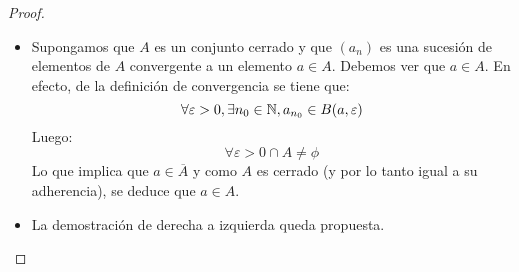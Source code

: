 \begin{proof}
	\begin{itemize}
		\item Supongamos que $A$ es un conjunto cerrado y que $(a_n)$ es una sucesión de elementos de $A$ convergente a un elemento $a \in A$. Debemos ver que $a \in A$. En efecto, de la definición de convergencia se tiene que: 
		$$ \forall \varepsilon > 0 , \exists n_0 \in \mathbb{N}, a_{n_0} \in B(a, \varepsilon) $$   
		Luego: 
		$$ \forall \varepsilon > 0 \cap A \neq \phi $$   
		Lo que implica que $a \in \overline{A}$ y como $A$ es cerrado (y por lo tanto igual a su adherencia), se deduce que $a \in A$.   
		
		\item La demostración de derecha a izquierda queda propuesta.
	\end{itemize}
\end{proof}

